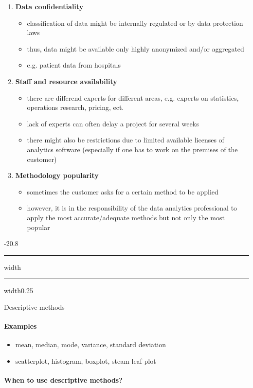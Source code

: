 \documentclass[a4paper, landscape, 6pt, fleqn]{scrartcl}
\makeatletter
\renewcommand{\emph}[1]{\textbf{#1}}
\renewcommand{\subsection}{\@startsection{subsection}{1}{0mm}%
{-2\baselineskip}{0.8\baselineskip}%
{\hrule depth 0.2pt width\columnwidth\hrule depth0.75pt
width0.25\columnwidth\vspace*{1.2em}\large\bfseries}}
\makeatother
\begin{document}
\begin{multicols*}{4}
\begin{enumerate}
\begin{itemize}
\end{itemize}
\item \emph{Data confidentiality}
\begin{itemize}
\item classification of data might be internally regulated or by data protection laws
\item thus, data might be available only highly anonymized and/or aggregated
\item e.g. patient data from hospitals
\end{itemize}
\item \emph{Staff and resource availability}
\begin{itemize}
\item there are differend experts for different areas, e.g. experts on statistics, operations research, pricing, ect.
\item lack of experts can often delay a project for several weeks
\item there might also be restrictions due to limited available licenses of analytics software (especially if one has to work on the premises of the customer)
\end{itemize}
\item \emph{Methodology popularity}
\begin{itemize}
\item sometimes the customer asks for a certain method to be applied
\item however, it is in the responsibility of the data analytics professional to apply the most accurate/adequate methods but not only the most popular
\end{itemize}
\end{enumerate}

\subsection{Descriptive methods}

\paragraph{Examples}

\begin{itemize}
\item mean, median, mode, variance, standard deviation
\item scatterplot, histogram, boxplot, steam-leaf plot
\end{itemize}

\paragraph{When to use descriptive methods?}


\end{multicols*}
\end{document}
